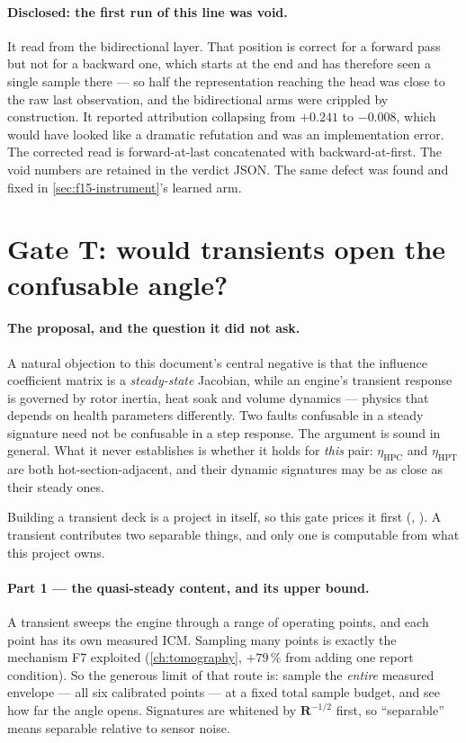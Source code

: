 \paragraph{Disclosed: the first run of this line was void.} It read  from the
bidirectional layer. That position is correct for a forward pass but not for a backward one,
which starts at the end and has therefore seen a single sample there --- so half the
representation reaching the head was close to the raw last observation, and the bidirectional
arms were crippled by construction. It reported attribution collapsing from $+0.241$ to
$-0.008$, which would have looked like a dramatic refutation and was an implementation error.
The corrected read is forward-at-last concatenated with backward-at-first. The void numbers are
retained in the verdict JSON. The same defect was found and fixed in
\cref{sec:f15-instrument}'s learned arm.

\section{Gate T: would transients open the confusable angle?}
\label{sec:gate-t}

\paragraph{The proposal, and the question it did not ask.} A natural objection to this
document's central negative is that the influence coefficient matrix is a \emph{steady-state}
Jacobian, while an engine's transient response is governed by rotor inertia, heat soak and
volume dynamics --- physics that depends on health parameters differently. Two faults
confusable in a steady signature need not be confusable in a step response. The argument is
sound in general. What it never establishes is whether it holds for \emph{this} pair:
$\eta_{\mathrm{HPC}}$ and $\eta_{\mathrm{HPT}}$ are both hot-section-adjacent, and their
dynamic signatures may be as close as their steady ones.

Building a transient deck is a project in itself, so this gate prices it first
(, ). A transient contributes two
separable things, and only one is computable from what this project owns.

\paragraph{Part 1 --- the quasi-steady content, and its upper bound.} A transient sweeps the
engine through a range of operating points, and each point has its own measured ICM. Sampling
many points is exactly the mechanism F7 exploited (\cref{ch:tomography}, $+79\,\%$ from adding
one report condition). So the generous limit of that route is: sample the \emph{entire}
measured envelope --- all six calibrated points --- at a fixed total sample budget, and see how
far the angle opens. Signatures are whitened by $\mathbf{R}^{-1/2}$ first, so ``separable''
means separable relative to sensor noise.

